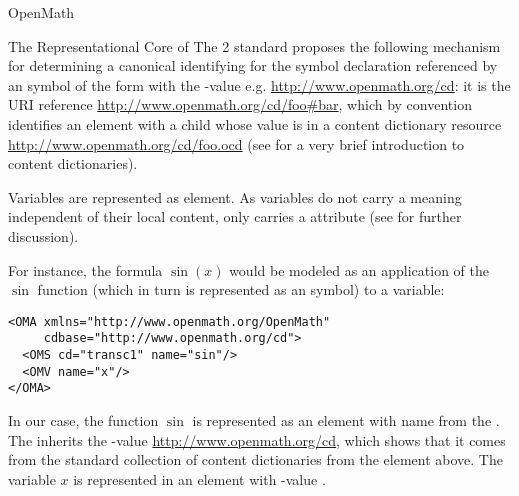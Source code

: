 \begin{omgroup}[id=mobj,short=Mathematical Objects]
\begin{omgroup}[id=openmath]{OpenMath}
\begin{module}[id=OpenMath]
\begin{omgroup}[id=om.core]{The Representational Core of {\openmath}}
The {\openmath}2 standard proposes the following mechanism for determining a canonical
identifying {} for the symbol declaration referenced by an {\openmath}
symbol of the form {} with the
{}-value e.g.  \url{http://www.openmath.org/cd}: it is the URI
reference \url{http://www.openmath.org/cd/foo#bar}, which by convention identifies an
 element with a child 
whose value is {} in a content dictionary resource
\url{http://www.openmath.org/cd/foo.ocd} (see {} for a
very brief introduction to {\openmath} content dictionaries). 

Variables are represented as  element.  As variables do not
carry a meaning independent of their local content,  only
carries a  attribute (see {} for
further discussion).

For instance, the formula $\sin(x)$ would be modeled as an application of the
$\sin$ function (which in turn is represented as an {\openmath} symbol) to a
variable:
\begin{lstlisting}[label=sinx,language=OpenMath,numbers=none,
   index={OMA,OMV,OMS}]
<OMA xmlns="http://www.openmath.org/OpenMath"
     cdbase="http://www.openmath.org/cd">
  <OMS cd="transc1" name="sin"/>
  <OMV name="x"/>
</OMA>
\end{lstlisting}

In our case, the function $\sin$ is represented as an  element
with name {} from the {}
{}. The  inherits the
{}-value \url{http://www.openmath.org/cd}, which shows that it
comes from the {\openmath} standard collection of content dictionaries from the
 element above.  The variable $x$ is represented
in an  element with -value
{}.


\end{omgroup}
\end{module}
\end{omgroup}
\end{omgroup}
